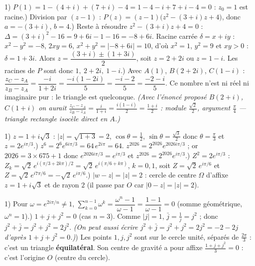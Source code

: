 1) $P(1)=1-(4+i)+(7+i)-4=1-4-i+7+i-4=0$ : $z_0=1$ est racine.) Division par $(z-1)$ : $P(z)=(z-1)\big(z^{2}-(3+i)z+4\big)$, donc $a=-(3+i)$, $b=4$.) Reste à résoudre $z^{2}-(3+i)z+4=0$ : $\Delta=(3+i)^{2}-16=9+6i-1-16=-8+6i$. Racine carrée
$\delta=x+iy$ : $x^{2}-y^{2}=-8$, $2xy=6$, $x^{2}+y^{2}=|{-8+6i}|=10$, d'où $x^{2}=1$, $y^{2}=9$ et
$xy>0$ : $\delta=1+3i$. Alors $z=\dfrac{(3+i)\pm(1+3i)}{2}$, soit $z=2+2i$ ou $z=1-i$. Les racines
de $P$ sont donc $1,\ 2+2i,\ 1-i$.) Avec $A(1)$, $B(2+2i)$, $C(1-i)$ :
$\dfrac{z_C-z_A}{z_B-z_A}=\dfrac{-i}{1+2i}=\dfrac{-i(1-2i)}{5}=\dfrac{-i-2}{5}=\dfrac{-2-i}{5}$.
Ce nombre n'est ni réel ni imaginaire pur : le triangle est quelconque. \emph{(Avec l'énoncé
proposé $B(2+i)$, $C(1+i)$ on aurait $\frac{z_C-z_A}{z_B-z_A}=\frac{i}{1+i}=\frac{i(1-i)}{2}
=\frac{1+i}{2}$ : module $\frac{\sqrt2}2$, argument $\frac\pi4$ — triangle rectangle isocèle
direct en $A$.)}

1) $z=1+i\sqrt3$ : $|z|=\sqrt{1+3}=2$, $\cos\theta=\frac12$, $\sin\theta=\frac{\sqrt3}2$ donc
$\theta=\frac\pi3$ et $z=2e^{i\pi/3}$.) $z^{6}=2^{6}e^{6i\pi/3}=64\,e^{2i\pi}=64$.\; $z^{2026}=2^{2026}e^{2026i\pi/3}$ ; or
$2026=3\times675+1$ donc $e^{2026i\pi/3}=e^{i\pi/3}$ et $z^{2026}=2^{2026}e^{i\pi/3}$.) $Z^{2}=2e^{i\pi/3}$ : $Z_k=\sqrt2\,e^{i(\pi/3+2k\pi)/2}=\sqrt2\,e^{i(\pi/6+k\pi)}$, $k=0,1$, soit
$Z=\sqrt2\,e^{i\pi/6}$ et $Z=\sqrt2\,e^{i7\pi/6}=-\sqrt2\,e^{i\pi/6}$.) $|w-z|=|z|=2$ : cercle de centre $\Omega$ d'affixe $z=1+i\sqrt3$ et de rayon $2$ (il passe par
$O$ car $|0-z|=|z|=2$).

1) Pour $\omega=e^{2i\pi/n}\neq1$, $\displaystyle\sum_{k=0}^{n-1}\omega^{k}
=\dfrac{\omega^{n}-1}{\omega-1}=\dfrac{1-1}{\omega-1}=0$ (somme géométrique, $\omega^{n}=1$).) $1+j+j^{2}=0$ (cas $n=3$). Comme $|j|=1$, $\bar j=\frac1j=j^{2}$ ; donc
$j^{2}+\bar j=j^{2}+j^{2}=2j^{2}$. \emph{(On peut aussi écrire $j^{2}+\bar j=j^{2}+j^{2}=2j^{2}
=-2-2j$ d'après $1+j+j^{2}=0$.)}) Les points $1,j,j^{2}$ sont sur le cercle unité, séparés de $\frac{2\pi}3$ : c'est un triangle
\textbf{équilatéral}. Son centre de gravité a pour affixe $\frac{1+j+j^{2}}3=0$ : c'est l'origine
$O$ (centre du cercle).
